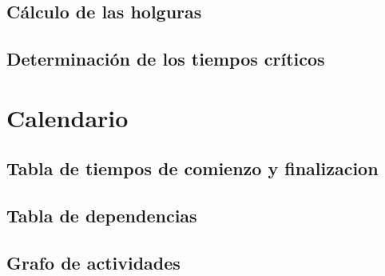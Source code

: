 \documentclass[11pt,a4paper,spanish,twoside]{report}
\begin{document}
\section{Cálculo de las holguras}
\section{Determinación de los tiempos críticos}

\chapter{Calendario}
\section{Tabla de tiempos de comienzo y finalizacion}
\section{Tabla de dependencias}
\section{Grafo de actividades}


 

\end{document}
